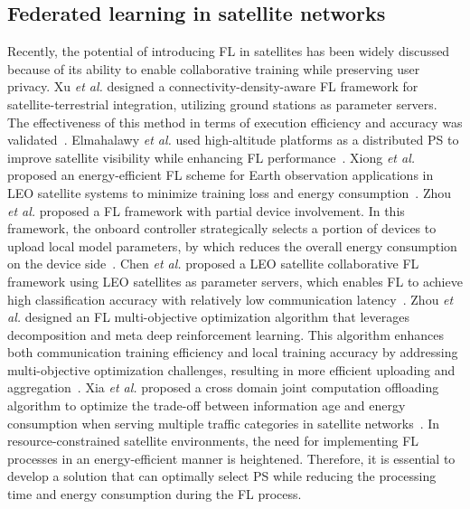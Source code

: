 \subsection{Federated learning in satellite networks}
Recently, the potential of introducing FL in satellites has been widely discussed because of its ability to enable collaborative training while preserving user privacy. Xu \textit{et al.} designed a connectivity-density-aware FL framework for satellite-terrestrial integration, utilizing ground stations as parameter servers. The effectiveness of this method in terms of execution efficiency and accuracy was validated~\cite{XUFGCS24}. Elmahalawy \textit{et al.} used high-altitude platforms as a distributed PS to improve satellite visibility while enhancing FL performance~\cite{ElmahallawySAC24}. Xiong \textit{et al.} proposed an energy-efficient FL scheme for Earth observation applications in LEO satellite systems to minimize training loss and energy consumption~\cite{XiongWCNC24}. Zhou \textit{et al.} proposed a FL framework with partial device involvement. In this framework, the onboard controller strategically selects a portion of devices to upload local model parameters, by which reduces the overall energy consumption on the device side~\cite{ZhouWCNC24}. Chen \textit{et al.} proposed a LEO satellite collaborative FL framework using LEO satellites as parameter servers, which enables FL to achieve high classification accuracy with relatively low communication latency~\cite{ChenPIMRC23}. Zhou \textit{et al.} designed an FL multi-objective optimization algorithm that leverages decomposition and meta deep reinforcement learning. This algorithm enhances both communication training efficiency and local training accuracy by addressing multi-objective optimization challenges, resulting in more efficient uploading and aggregation~\cite{ZhouSAC24}. Xia \textit{et al.} proposed a cross domain joint computation offloading algorithm to optimize the trade-off between information age and energy consumption when serving multiple traffic categories in satellite networks~\cite{XiaPIMRC23}. In resource-constrained satellite environments, the need for implementing FL processes in an energy-efficient manner is heightened. Therefore, it is essential to develop a solution that can optimally select PS while reducing the processing time and energy consumption during the FL process. 

